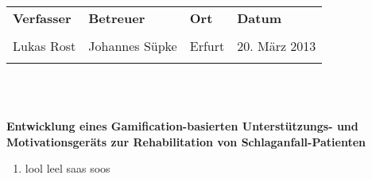 \documentclass[a4paper, 12pt, titlepage, bibliography=totocnumbered]{scrartcl}
\begin{document}

\begin{tabularx}{\textwidth}{Y|Y|Y|Y}
	\textbf{Verfasser} & \textbf{Betreuer} & \textbf{Ort} & \textbf{Datum}\\
	& & & \\
	Lukas Rost & Johannes Süpke & Erfurt & 20. März 2013 \\
	& & & \\
\end{tabularx} \\
\begin{center}
	\begin{LARGE}
		\textbf{\\ Entwicklung eines Gamification-basierten Unterstützungs- und Motivationsgeräts zur Rehabilitation von Schlaganfall-Patienten \\}
	\end{LARGE}
\end{center}

\begin{enumerate}
	\item lool leel saas soos
\end{enumerate}
\end{document}
